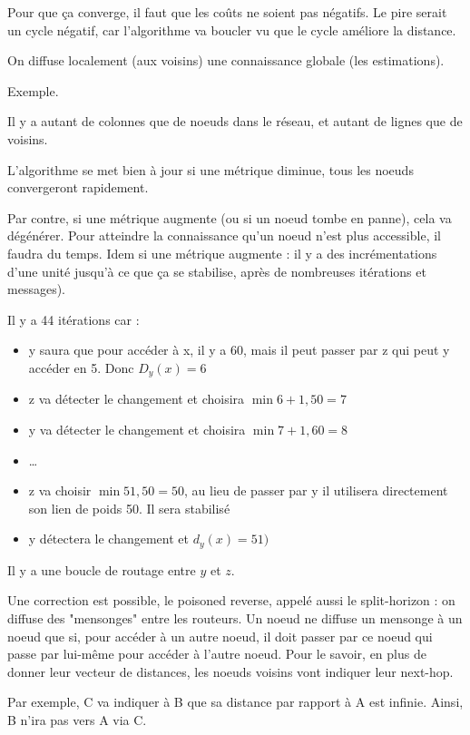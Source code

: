 	Pour que ça converge, il faut que les coûts ne soient pas négatifs. Le pire serait un cycle négatif, car l'algorithme va boucler vu que le cycle améliore la distance.

On diffuse localement (aux voisins) une connaissance globale (les estimations).

	Exemple.
	
	
	Il y a autant de colonnes que de noeuds dans le réseau, et autant de lignes que de voisins.
	
	L'algorithme se met bien à jour si une métrique diminue, tous les noeuds convergeront rapidement.
	
	Par contre, si une métrique augmente (ou si un noeud tombe en panne), cela va dégénérer. Pour atteindre la connaissance qu'un noeud n'est plus accessible, il faudra du temps. Idem si une métrique augmente : il y a des incrémentations d'une unité jusqu'à ce que ça se stabilise, après de nombreuses itérations et messages).
	
	
	
	Il y a 44 itérations car :
	
	\begin{itemize}
		\item y saura que pour accéder à x, il y a 60, mais il peut passer par z qui peut y accéder en 5. Donc $D_y(x) = 6$
		\item z va détecter le changement et choisira $\min{6 + 1, 50} = 7$
		\item y va détecter le changement et choisira $\min{7 + 1, 60} = 8$
		\item \dots
		\item z va choisir $\min{51, 50} = 50$, au lieu de passer par y il utilisera directement son lien de poids 50. Il sera stabilisé
		\item y détectera le changement et $d_y(x) = 51)$
	\end{itemize}
	
	Il y a une boucle de routage entre $y$ et $z$.
	
	Une correction est possible, le poisoned reverse, appelé aussi le split-horizon : on diffuse des  "mensonges" entre les routeurs. Un noeud ne diffuse un mensonge à un noeud que si, pour accéder à un autre noeud, il doit passer par ce noeud qui passe par lui-même pour accéder à l'autre noeud. Pour le savoir, en plus de donner leur vecteur de distances, les noeuds voisins vont indiquer leur next-hop.
	
	Par exemple, C va indiquer à B que sa distance par rapport à A est infinie. Ainsi, B n'ira pas vers A via C.
	
